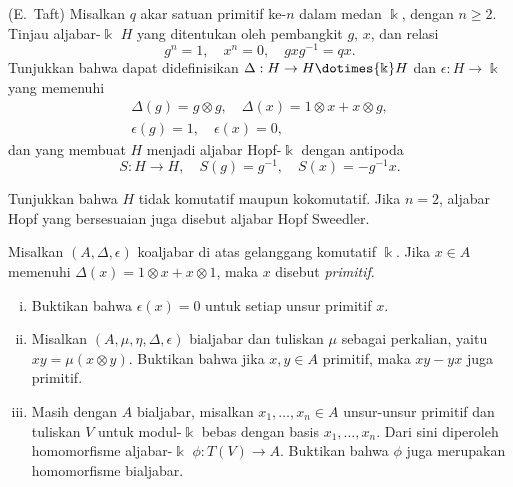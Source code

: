 	\item (E.\ Taft) Misalkan $q$ akar satuan primitif ke-$n$ dalam medan
	$\Bbbk$, dengan $n\geq2$. Tinjau aljabar-$\Bbbk$ $H$ yang ditentukan oleh
	pembangkit $g$, $x$, dan relasi
	\[ g^n = 1, \quad x^n = 0, \quad gxg^{-1} = qx. \]
	Tunjukkan bahwa dapat didefinisikan
	$\Delta:H\to H\dotimes{\Bbbk}H$ dan $\epsilon:H\to\Bbbk$ yang memenuhi
	\begin{gather*}
		\Delta(g) = g \otimes g, \quad \Delta(x) = 1 \otimes x + x \otimes g, \\
		\epsilon(g) = 1, \quad \epsilon(x) = 0,
	\end{gather*}
	dan yang membuat $H$ menjadi aljabar Hopf-$\Bbbk$ dengan antipoda
	\[ S:H\to H, \quad S(g)=g^{-1}, \quad S(x)=-g^{-1}x. \]

	Tunjukkan bahwa $H$ tidak komutatif maupun kokomutatif. Jika $n=2$,
	aljabar Hopf yang bersesuaian juga disebut aljabar Hopf Sweedler.

	\item Misalkan $(A,\Delta,\epsilon)$ koaljabar di atas gelanggang komutatif
	$\Bbbk$. Jika $x\in A$ memenuhi $\Delta(x)=1\otimes x+x\otimes1$, maka
	$x$ disebut \emph{primitif}.
	\begin{enumerate}[(i)]
		\item Buktikan bahwa $\epsilon(x)=0$ untuk setiap unsur primitif $x$.
		\item Misalkan $(A,\mu,\eta,\Delta,\epsilon)$ bialjabar dan tuliskan
		$\mu$ sebagai perkalian, yaitu $xy=\mu(x\otimes y)$. Buktikan bahwa jika
		$x,y\in A$ primitif, maka $xy-yx$ juga primitif.
		\item Masih dengan $A$ bialjabar, misalkan $x_1,\ldots,x_n\in A$
		unsur-unsur primitif dan tuliskan $V$ untuk modul-$\Bbbk$ bebas dengan
		basis $x_1,\ldots,x_n$. Dari sini diperoleh homomorfisme aljabar-$\Bbbk$
		$\phi:T(V)\to A$. Buktikan bahwa $\phi$ juga merupakan homomorfisme
		bialjabar.
	\end{enumerate}

